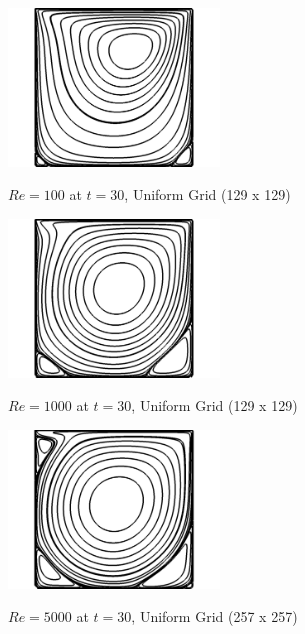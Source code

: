 \documentclass[twocolumn,10pt]{asme2ej}
\begin{document}
\begin{figure}[htb]
\begin{center}
\includegraphics[width=0.5\textwidth]{figure/Re100.png}
\caption{$Re = 100$ at $t = 30$, Uniform Grid (129 x 129)}
\label{Re100}
\vspace{5mm} %
\includegraphics[width=0.5\textwidth]{figure/Re1000.png}
\caption{$Re = 1000$ at $t = 30$, Uniform Grid (129 x 129)}
\label{Re1000}
\vspace{5mm} %
\includegraphics[width=0.5\textwidth]{figure/Re5000.png}
\caption{$Re = 5000$ at $t = 30$, Uniform Grid (257 x 257)}
\label{Re5000}
\end{center}
\end{figure}
\end{document}
